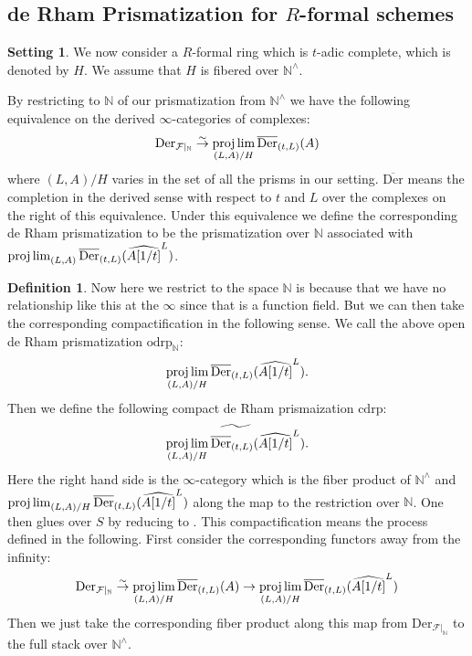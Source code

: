 \documentclass[12pt]{article}
\theoremstyle{definition}
\newtheorem{definition}{Definition}
\newtheorem{setting}{Setting}
\begin{document}
\subsection{de Rham Prismatization for $R$-formal schemes}

\begin{setting}
We now consider a $R$-formal ring which is $t$-adic complete, which is denoted by $H$. We assume that $H$ is fibered over $\mathbb{N}^\wedge$.
\end{setting}


By restricting to $\mathbb{N}$ of our prismatization from $\mathbb{N}^\wedge$ we have the following equivalence on the derived $\infty$-categories of complexes:
\begin{align}
\mathrm{Der}_{\mathcal{F}|_{\mathbb{N}}}\overset{\sim}{\rightarrow} \projlim_{(L,A)/H}\overline{\mathrm{Der}}_{(t,L)}(A)
\end{align}
where $(L,A)/H$ varies in the set of all the prisms in our setting. $\overline{\mathrm{Der}}$ means the completion in the derived sense with respect to $t$ and $L$ over the complexes on the right of this equivalence. Under this equivalence we define the corresponding de Rham prismatization to be the prismatization over $\mathbb{N}$ associated with $\projlim_{(L,A)}\overline{\mathrm{Der}}_{(t,L)}(\widehat{A[1/t]}^{L})$.




\begin{definition}
Now here we restrict to the space $\mathbb{N}$ is because that we have no relationship like this at the $\infty$ since that is a function field. But we can then take the corresponding compactification in the following sense. We call the above open de Rham prismatization $\mathrm{odrp}_\mathbb{N}$:
\begin{align}
\projlim_{(L,A)/H}\overline{\mathrm{Der}}_{(t,L)}(\widehat{A[1/t]}^{L}).
\end{align}
Then we define the following compact de Rham prismaization $\mathrm{cdrp}$:
\begin{align}
\widetilde{\projlim_{(L,A)/H}\overline{\mathrm{Der}}_{(t,L)}(\widehat{A[1/t]}^{L})}.
\end{align}
Here the right hand side is the $\infty$-category which is the fiber product of $\mathbb{N}^\wedge$ and $\projlim_{(L,A)/H}\overline{\mathrm{Der}}_{(t,L)}(\widehat{A[1/t]}^{L})$ along the map to the restriction over $\mathbb{N}$.  
One then glues over $S$ by reducing to \cite{2BL}. This compactification means the process defined in the following. First consider the corresponding functors away from the infinity:
\begin{align}
\mathrm{Der}_{\mathcal{F}|_{\mathbb{N}}}\overset{\sim}{\rightarrow} \projlim_{(L,A)/H}\overline{\mathrm{Der}}_{(t,L)}(A) \overset{}{\rightarrow} \projlim_{(L,A)/H}\overline{\mathrm{Der}}_{(t,L)}(\widehat{A[1/t]}^L)
\end{align}
Then we just take the corresponding fiber product along this map from $\mathrm{Der}_{\mathcal{F}|_{\mathbb{N}}}$ to the full stack over $\mathbb{N}^\wedge$.
\end{definition}
\end{document}
